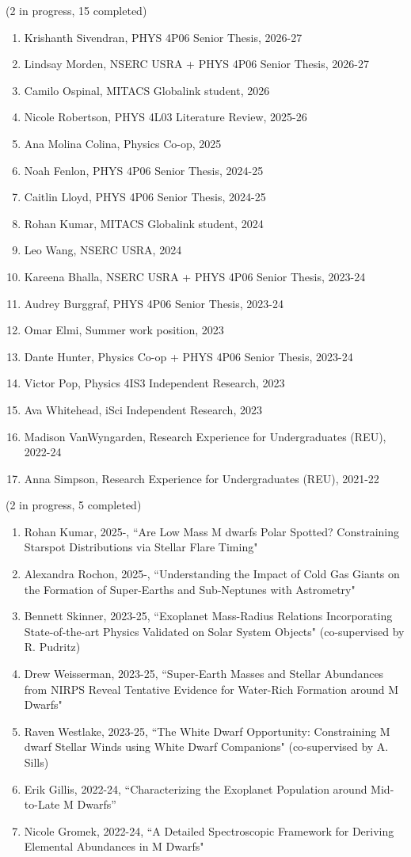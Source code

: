 \documentclass[12pt]{article}
\begin{document}
 (2 in progress, 15 completed)
\begin{enumerate}[noitemsep]
\item Krishanth Sivendran, PHYS 4P06 Senior Thesis, 2026-27
\item Lindsay Morden, NSERC USRA + PHYS 4P06 Senior Thesis, 2026-27
\item Camilo Ospinal, MITACS Globalink student, 2026
\item Nicole Robertson, PHYS 4L03 Literature Review, 2025-26
\item Ana Molina Colina, Physics Co-op, 2025
\item Noah Fenlon, PHYS 4P06 Senior Thesis, 2024-25
\item Caitlin Lloyd, PHYS 4P06 Senior Thesis, 2024-25
\item Rohan Kumar, MITACS Globalink student, 2024
\item Leo Wang, NSERC USRA, 2024
\item Kareena Bhalla, NSERC USRA + PHYS 4P06 Senior Thesis, 2023-24
\item Audrey Burggraf, PHYS 4P06 Senior Thesis, 2023-24
\item Omar Elmi, Summer work position, 2023
\item Dante Hunter, Physics Co-op + PHYS 4P06 Senior Thesis, 2023-24
\item Victor Pop, Physics 4IS3 Independent Research, 2023
\item Ava Whitehead, iSci Independent Research, 2023
\item Madison VanWyngarden, Research Experience for Undergraduates (REU), 2022-24
\item Anna Simpson, Research Experience for Undergraduates (REU), 2021-22
\end{enumerate}

 (2 in progress, 5 completed)
\begin{enumerate}[noitemsep]
\item Rohan Kumar, 2025-, ``Are Low Mass M dwarfs Polar Spotted? Constraining Starspot Distributions via Stellar Flare Timing"
\item Alexandra Rochon, 2025-, ``Understanding the Impact of Cold Gas Giants on the Formation of Super-Earths and Sub-Neptunes with Astrometry"
\item Bennett Skinner, 2023-25, ``Exoplanet Mass-Radius Relations Incorporating State-of-the-art Physics Validated on Solar System Objects" (co-supervised by R. Pudritz)
\item Drew Weisserman, 2023-25, ``Super-Earth Masses and Stellar Abundances from NIRPS Reveal Tentative Evidence for Water-Rich Formation around M Dwarfs"
\item Raven Westlake, 2023-25, ``The White Dwarf Opportunity: Constraining M dwarf Stellar Winds using White Dwarf Companions" (co-supervised by A. Sills)
\item Erik Gillis, 2022-24, ``Characterizing the Exoplanet Population around Mid-to-Late M Dwarfs''
\item Nicole Gromek, 2022-24, ``A Detailed Spectroscopic Framework for Deriving Elemental Abundances in M Dwarfs"
\end{enumerate}
\end{document}
